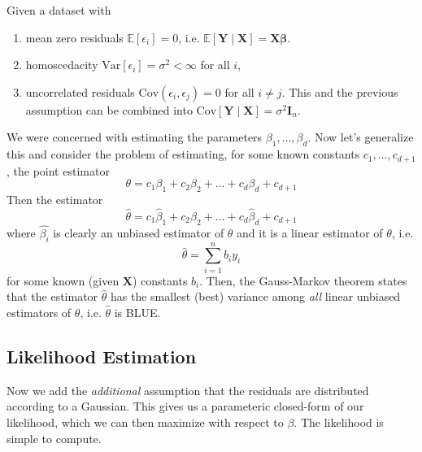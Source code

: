  \begin{theorem}
    Given a dataset with 
    \begin{enumerate}
      \item mean zero residuals $\mathbb{E}[\epsilon_i] = 0$, i.e. $\mathbb{E}[\mathbf{Y} \mid \mathbf{X}] = \mathbf{X} \boldsymbol{\beta}$. 
      \item homoscedacity $\mathrm{Var}[\epsilon_i] = \sigma^2 < \infty$ for all $i$, 
      \item uncorrelated residuals $\mathrm{Cov}(\epsilon_i, \epsilon_j) = 0$ for all $i \neq j$. This and the previous assumption can be combined into $\mathrm{Cov}[\mathbf{Y} \mid \mathbf{X}] = \sigma^2 \mathbf{I}_n$. 
    \end{enumerate}
    We were concerned with estimating the parameters $\beta_1, \ldots, \beta_d$. Now let's generalize this and consider the problem of estimating, for some known constants $c_1, \ldots, c_{d+1}$, the point estimator 
    \begin{equation}
      \theta = c_1 \beta_1 + c_2 \beta_2 + \ldots + c_d \beta_d + c_{d+1}
    \end{equation}
    Then the estimator 
    \begin{equation}
      \hat{\theta} = c_1 \hat{\beta}_1 + c_2 \hat{\beta}_2 + \ldots + c_d \hat{\beta}_d + c_{d+1}
    \end{equation}
    where $\hat{\beta_i}$ is clearly an unbiased estimator of $\theta$ and it is a linear estimator of $\theta$, i.e. 
    \begin{equation}
      \hat{\theta} = \sum_{i=1}^n b_i y_i
    \end{equation}
    for some known (given $\mathbf{X}$) constants $b_i$. Then, the Gauss-Markov theorem states that the estimator $\hat{\theta}$ has the smallest (best) variance among \textit{all} linear unbiased estimators of $\theta$, i.e. $\hat{\theta}$ is BLUE. 
  \end{theorem}

\subsection{Likelihood Estimation}

  Now we add the \textit{additional} assumption that the residuals are distributed according to a Gaussian. This gives us a parameteric closed-form of our likelihood, which we can then maximize with respect to $\beta$. The likelihood is simple to compute. 

